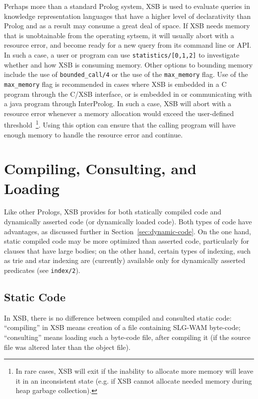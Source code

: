  
Perhaps more than a standard Prolog system, XSB is used to evaluate
queries in knowledge representation languages that have a higher level
of declarativity than Prolog and as a result may consume a great deal
of space.  If XSB needs memory that is unobtainable from the operating
sytsem, it will usually abort with a resource error, and become ready
for a new query from its command line or API.  In such a case, a user
or program can use {\tt statistics/[0,1,2]} to investigate whether and
how XSB is consuming memory.  Other options to bounding memory include
the use of {\tt bounded\_call/4} or the use of the {\tt max\_memory}
flag.  Use of the {\tt max\_memory} flag is recommended in cases where
XSB is embedded in a C program through the C/XSB interface, or is
embedded in or communicating with a java program through InterProlog.
In such a case, XSB will abort with a resource error whenever a memory
allocation would exceed the user-defined threshold~\footnote{In rare
  cases, XSB will exit if the inability to allocate more memory will
  leave it in an inconsistent state (e.g. if XSB cannot allocate
  needed memory during heap garbage collection).}.  Using this option
can ensure that the calling program will have enough memory to handle
the resource error and continue.

\section{Compiling, Consulting, and Loading} \label{Consulting}
Like other Prologs, XSB provides for both statically compiled code and
dynamically asserted code (or dynamically loaded code).  Both types of
code have advantages, as discussed further in
Section~\ref{sec:dynamic-code}.  On the one hand, static compiled code
may be more optimized than asserted code, particularly for clauses
that have large bodies; on the other hand, certain types of indexing,
such as trie and star indexing are (currently) available only for
dynamically asserted predicates (see {\tt index/2}).

\subsection{Static Code}
%
In XSB, there is no difference between compiled and consulted static
code: ``compiling'' in XSB means creation of a file containing SLG-WAM
byte-code; ``consulting'' means loading such a byte-code file, after
compiling it (if the source file was altered later than the object
file).

